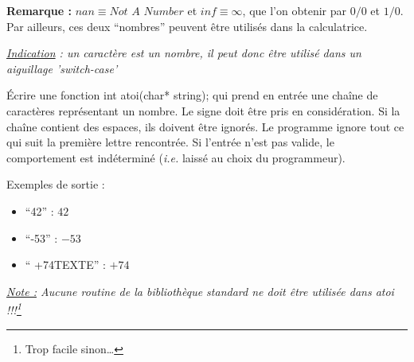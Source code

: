 \documentclass[../../../main.tex]{subfiles}
\begin{document}
\textbf{Remarque : } $nan\equiv{\textit{Not A Number}}$ et $inf\equiv{\infty}$, que l'on obtenir par $0/0$ et $1/0$. Par ailleurs, ces deux ``nombres'' peuvent être utilisés dans la calculatrice.
 
\textit{\underline{Indication} : un caractère est un nombre, il peut donc être utilisé dans un aiguillage 'switch-case'}

Écrire une fonction \textsf{int atoi(char* string);} qui prend en entrée une chaîne de caractères représentant un nombre. Le signe doit être pris en considération. Si la chaîne contient des espaces, ils doivent être ignorés. Le programme ignore tout ce qui suit la première lettre rencontrée.\newline
Si l'entrée n'est pas valide, le comportement est indéterminé (\textit{i.e.} laissé au choix du programmeur).

Exemples de sortie :
\begin{itemize}
	\item ``42'' : $42$
	\item ``-53'' : $-53$
	\item `` +74TEXTE'' : $+74$
\end{itemize}
\textit{\underline{Note :} Aucune routine de la bibliothèque standard ne doit être utilisée dans \textsf{atoi} !!!\footnote{Trop facile sinon\dots}}
\end{document}
